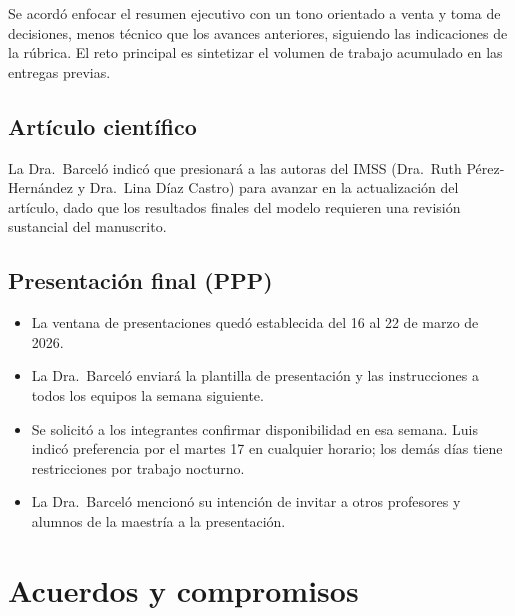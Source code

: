\documentclass[11pt,letterpaper]{article}
\begin{document}
Se acordó enfocar el resumen ejecutivo con un tono orientado a venta y toma de decisiones, menos técnico que los avances anteriores, siguiendo las indicaciones de la rúbrica. El reto principal es sintetizar el volumen de trabajo acumulado en las entregas previas.

\subsection{Artículo científico}

La Dra.\ Barceló indicó que presionará a las autoras del IMSS (Dra.\ Ruth Pérez-Hernández y Dra.\ Lina Díaz Castro) para avanzar en la actualización del artículo, dado que los resultados finales del modelo requieren una revisión sustancial del manuscrito.

\subsection{Presentación final (PPP)}

\begin{itemize}[leftmargin=1.5em]
    \item La ventana de presentaciones quedó establecida del 16 al 22 de marzo de 2026.
    \item La Dra.\ Barceló enviará la plantilla de presentación y las instrucciones a todos los equipos la semana siguiente.
    \item Se solicitó a los integrantes confirmar disponibilidad en esa semana. Luis indicó preferencia por el martes 17 en cualquier horario; los demás días tiene restricciones por trabajo nocturno.
    \item La Dra.\ Barceló mencionó su intención de invitar a otros profesores y alumnos de la maestría a la presentación.
\end{itemize}

\section{Acuerdos y compromisos}
\end{document}
